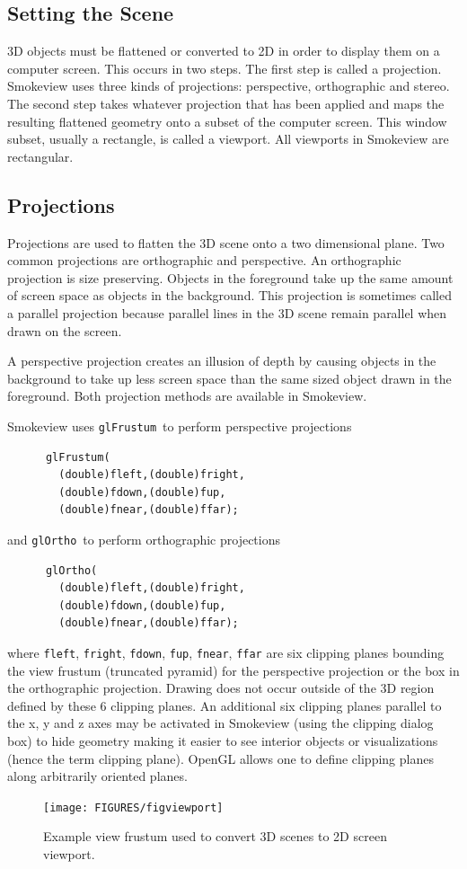 \documentclass[11pt,twoside]{book}
\begin{document}
\subsection{Setting the Scene}
3D objects must be flattened or converted to 2D in order to display them on a computer screen.  This occurs in two steps.  The first step is called a projection.  Smokeview uses three kinds of projections: perspective, orthographic and stereo.  The second step takes whatever projection that has been applied and maps the resulting flattened geometry onto a subset of the computer screen. This window subset, usually a rectangle, is called a viewport. All viewports in Smokeview are rectangular.

\subsection{Projections}
Projections are used to flatten the 3D scene onto a two dimensional plane. Two common projections are orthographic and perspective. An orthographic projection is size preserving. Objects in the foreground take up the same amount of screen space as objects in the background. This projection is sometimes called a parallel projection because parallel lines in the 3D scene remain parallel when drawn on the screen.

A perspective projection creates an illusion of depth by causing objects in the background to take up less screen space than the same sized object drawn in the foreground.  Both projection methods are available in Smokeview.

Smokeview uses {\tt glFrustum}\ to perform perspective projections
\begin{lstlisting}
      glFrustum(
        (double)fleft,(double)fright,
        (double)fdown,(double)fup,
        (double)fnear,(double)ffar);
\end{lstlisting}
and {\tt glOrtho}\ to perform orthographic projections
\begin{lstlisting}
      glOrtho(
        (double)fleft,(double)fright,
        (double)fdown,(double)fup,
        (double)fnear,(double)ffar);
\end{lstlisting}

\noindent where {\tt fleft}, {\tt fright}, {\tt fdown}, {\tt fup}, {\tt fnear}, {\tt ffar} are six clipping planes bounding the view frustum (truncated pyramid) for the perspective projection or the box in the orthographic projection.  Drawing does not occur outside of the 3D region defined by these 6 clipping planes. An additional six clipping planes parallel to the x, y and z axes may be activated in Smokeview (using the clipping dialog box) to hide geometry making it easier to see interior objects or visualizations (hence the term clipping plane).  OpenGL allows one to define clipping planes along arbitrarily oriented planes.
\begin{figure}[\figoptions]
\begin{center}
\texttt{[image: FIGURES/figviewport]}
\end{center}
\caption{Example view frustum used to convert 3D scenes to 2D
screen viewport.}
 \label{figfrustum}
\end{figure}
\end{document}
